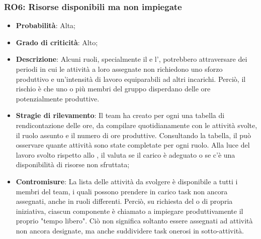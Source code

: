 \subsubsection{RO6: Risorse disponibili ma non impiegate}
\begin{itemize}
    \item \textbf{Probabilità}: Alta;
    \item \textbf{Grado di criticità}: Alto;
    \item \textbf{Descrizione}: Alcuni ruoli, specialmente il \Verificatore{} e l'\Amministratore{}, potrebbero attraversare dei periodi in cui le attività a loro assegnate non richiedono uno sforzo produttivo e un'intensità di lavoro equiparabili ad altri incarichi. Perciò, il rischio è che uno o più membri del gruppo disperdano delle ore potenzialmente produttive.
    \item \textbf{Stragie di rilevamento}: Il team ha creato per ogni  una tabella di rendicontazione delle ore, da compilare quotidianamente con le attività svolte, il ruolo assunto e il numero di ore produttive. Consultando la tabella, il \Responsabile{} può osservare quante attività sono state completate per ogni ruolo. Alla luce del lavoro svolto rispetto allo , il \Responsabile{} valuta se il carico è adeguato o se c'è una disponibilità di risorse non sfruttata;
    \item \textbf{Contromisure}: La lista delle attività da svolgere è disponibile a tutti i membri del team, i quali possono prendere in carico task non ancora assegnati, anche in ruoli differenti. Perciò, su richiesta del \Responsabile{} o di propria iniziativa, ciascun componente è chiamato a impiegare produttivamente il proprio "tempo libero". Ciò non significa soltanto essere assegnati ad attività non ancora designate, ma anche suddividere task onerosi in sotto-attività. 
\end{itemize}
